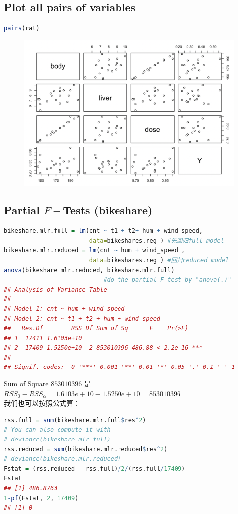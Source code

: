 \documentclass[11pt,a4paper]{article}
\begin{document}
\subsection{Plot all pairs of variables}
\begin{lstlisting}[language=R]
pairs(rat)
\end{lstlisting}
\begin{center}\begin{figure}[htbp]
  \centering
  \includegraphics[scale=0.5]{rat1.png}
  \caption{}
  \label{}
\end{figure}\end{center}






\subsection{Partial $F-$Tests (bikeshare)}
\begin{lstlisting}[language=R]
bikeshare.mlr.full = lm(cnt ~ t1 + t2+ hum + wind_speed,
                        data=bikeshares.reg ) #先回归full model
bikeshare.mlr.reduced = lm(cnt ~ hum + wind_speed ,
                        data=bikeshares.reg ) #回归reduced model
anova(bikeshare.mlr.reduced, bikeshare.mlr.full)
                            #do the partial F-test by "anova(.)"
## Analysis of Variance Table
## 
## Model 1: cnt ~ hum + wind_speed
## Model 2: cnt ~ t1 + t2 + hum + wind_speed
##   Res.Df        RSS Df Sum of Sq      F    Pr(>F)
## 1  17411 1.6103e+10
## 2  17409 1.5250e+10  2 853010396 486.88 < 2.2e-16 ***
## ---
## Signif. codes:  0 '***' 0.001 '**' 0.01 '*' 0.05 '.' 0.1 ' ' 1
\end{lstlisting}
Sum of Square $853010396$ 是 $RSS_0-RSS_\alpha=1.6103e+10-1.5250e+10=853010396$\\
我们也可以按照公式算：
\begin{lstlisting}[language=R]
rss.full = sum(bikeshare.mlr.full$res^2)
# You can also compute it with
# deviance(bikeshare.mlr.full)
rss.reduced = sum(bikeshare.mlr.reduced$res^2)
# deviance(bikeshare.mlr.reduced)
Fstat = (rss.reduced - rss.full)/2/(rss.full/17409)
Fstat
## [1] 486.8763
1-pf(Fstat, 2, 17409)
## [1] 0
\end{lstlisting}
\end{document}
